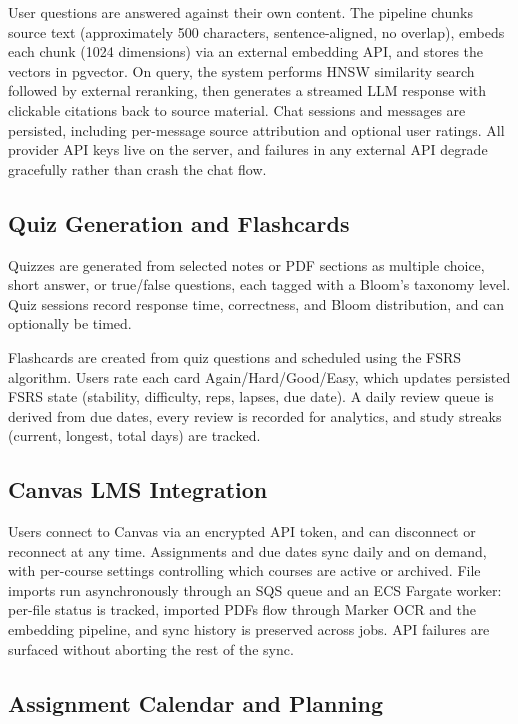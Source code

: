 \documentclass[12pt,a4paper]{article}
\begin{document}
User questions are answered against their own content. The pipeline chunks source text (approximately 500 characters, sentence-aligned, no overlap), embeds each chunk (1024 dimensions) via an external embedding API, and stores the vectors in pgvector. On query, the system performs HNSW similarity search followed by external reranking, then generates a streamed LLM response with clickable citations back to source material. Chat sessions and messages are persisted, including per-message source attribution and optional user ratings. All provider API keys live on the server, and failures in any external API degrade gracefully rather than crash the chat flow.

\subsection{Quiz Generation and Flashcards}

Quizzes are generated from selected notes or PDF sections as multiple choice, short answer, or true/false questions, each tagged with a Bloom's taxonomy level. Quiz sessions record response time, correctness, and Bloom distribution, and can optionally be timed.

Flashcards are created from quiz questions and scheduled using the FSRS algorithm. Users rate each card Again/Hard/Good/Easy, which updates persisted FSRS state (stability, difficulty, reps, lapses, due date). A daily review queue is derived from due dates, every review is recorded for analytics, and study streaks (current, longest, total days) are tracked.

\subsection{Canvas LMS Integration}

Users connect to Canvas via an encrypted API token, and can disconnect or reconnect at any time. Assignments and due dates sync daily and on demand, with per-course settings controlling which courses are active or archived. File imports run asynchronously through an SQS queue and an ECS Fargate worker: per-file status is tracked, imported PDFs flow through Marker OCR and the embedding pipeline, and sync history is preserved across jobs. API failures are surfaced without aborting the rest of the sync.

\subsection{Assignment Calendar and Planning}
\end{document}
